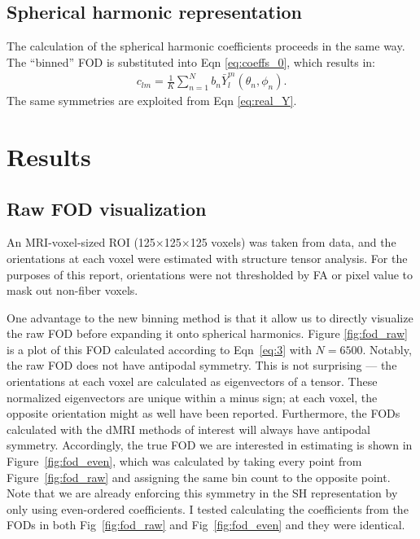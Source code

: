 \documentclass{article}
\begin{document}
\subsection{Spherical harmonic representation}
The calculation of the spherical harmonic coefficients proceeds in the same way. The
``binned'' FOD is substituted into Eqn \ref{eq:coeffs_0}, which results in:
\begin{align}
  c_{lm} = \frac{1}{K}\sum_{n=1}^N b_n \bar{Y}_l^m(\theta_n, \phi_n).
  \label{eq:4}
\end{align}
The same symmetries are exploited from Eqn \ref{eq:real_Y}.

\section{Results}
\subsection{Raw FOD visualization}
An MRI-voxel-sized ROI (125$\times$125$\times$125 voxels) was taken from \uct
data, and the orientations at each voxel were estimated with structure tensor
analysis. For the purposes of this report, orientations were not thresholded by
FA or pixel value to mask out non-fiber voxels.

One advantage to the new binning method is that it allow us to directly
visualize the raw FOD before expanding it onto spherical harmonics. Figure
\ref{fig:fod_raw} is a plot of this FOD calculated according to Eqn~\ref{eq:3}
with $N=6500$. Notably, the raw FOD does not have antipodal symmetry. This is
not surprising --- the orientations at each voxel are calculated as eigenvectors
of a tensor. These normalized eigenvectors are unique within a minus sign; at
each voxel, the opposite orientation might as well have been
reported. Furthermore, the FODs calculated with the dMRI methods of interest
will always have antipodal symmetry. Accordingly, the true \uct FOD we are
interested in estimating is shown in Figure~\ref{fig:fod_even}, which was
calculated by taking every point from Figure~\ref{fig:fod_raw} and assigning the
same bin count to the opposite point. Note that we are already enforcing this
symmetry in the SH representation by only using even-ordered coefficients. I
tested calculating the coefficients from the FODs in both Fig~\ref{fig:fod_raw}
and Fig~\ref{fig:fod_even} and they were identical.
\end{document}
